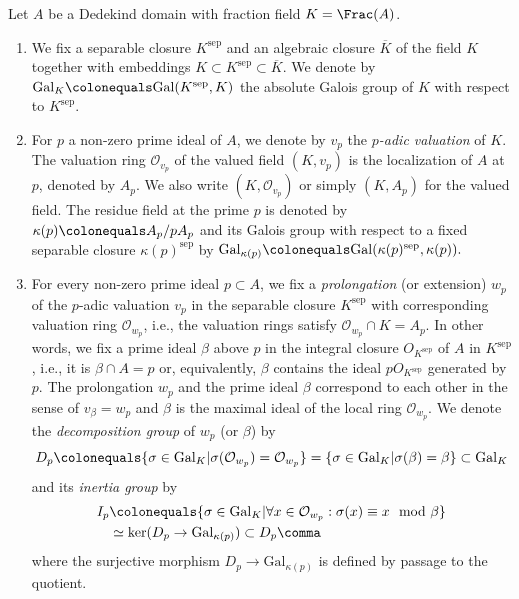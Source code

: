 \documentclass[leqno]{article}
\renewcommand{\Gal}{\mathrm{Gal}}
\begin{document}
\begin{recollection}
Let $A$ be a Dedekind domain with fraction field $K=\Frac(A)$. 
\begin{enumerate}
     \item We fix a separable closure $K^{\mathrm{sep}}$ and an algebraic closure $\overline{K}$ of the field $K$ together with embeddings $K\subset K^{\mathrm{sep}}\subset \overline{K}.$ We denote by $\Gal_K\colonequals \Gal(K^{\mathrm{sep}},K)$ the absolute Galois group of $K$ with respect to $ K^{\mathrm{sep}}$.
    \item For $p$ a non-zero prime ideal of $A$, we denote by $v_p$ the \textit{$p$-adic valuation} of $K$. The valuation ring $\mathcal{O}_{v_p}$ of the valued field $(K,v_p)$ is the localization of $A$ at $p$, denoted by $A_p$.
    We also write $(K,\mathcal{O}_{v_p})$ or simply $(K,A_p)$ for the valued field. The residue field at the prime $p$ is denoted by $\kappa(p)\colonequals A_p/pA_p$ and its Galois group with respect to a fixed separable closure $\kappa(p)^{\mathrm{sep}}$ by $\Gal_{\kappa(p)}\colonequals \Gal(\kappa(p)^{\mathrm{sep}}, \kappa(p)).$
    \item For every non-zero prime ideal $p\subset A$, we fix a \textit{prolongation} (or extension) 
    $w_p$ of the $p$-adic valuation $v_p$ in the separable closure $K^{\mathrm{sep}}$ with corresponding valuation ring $\mathcal{O}_{w_p}$, i.e., the valuation rings satisfy $\mathcal{O}_{w_p}\cap K=A_p$. In other words, we fix a prime ideal $\beta$ above $p$ in the integral closure ${O}_{K^{\mathrm{sep}}}$ of $A$ in $K^{\mathrm{sep}}$, i.e., it is $\beta \cap A = p$ or, equivalently, $\beta$ contains the ideal $p{O}_{K^{\mathrm{sep}}}$ generated by $p$. The prolongation $w_p$ and the prime ideal $\beta$ correspond to each other in the sense of $v_{\beta}=w_p$ and $\beta$ is the maximal ideal of the local ring $\mathcal{O}_{w_p}$.  We denote the \textit{decomposition group} of $w_p$ (or $\beta$) by 
    $$D_p\colonequals \{\sigma \in \Gal_K| \sigma(\mathcal{O}_{w_p})=\mathcal{O}_{w_p}\}= \{\sigma \in \Gal_K| \sigma(\beta)=\beta\}\subset \Gal_K$$ and its \textit{inertia group} by 
    \begin{align*}
    I_p&\colonequals \{\sigma \in \Gal_K| \forall x \in \mathcal{O}_{w_p}:  \sigma(x)\equiv x\mod \beta\}\\
    &\simeq \ker(D_p \rightarrow \Gal_{\kappa(p)}) \subset D_p\comma    
    \end{align*}
    where the surjective morphism $D_p \rightarrow \Gal_{\kappa(p)}$ is defined by passage to the quotient. 
\end{enumerate}
\end{recollection}
\end{document}
